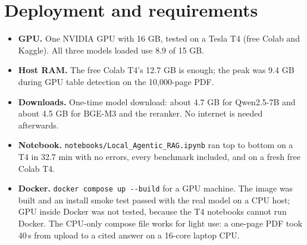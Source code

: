 \documentclass[10pt,a4paper]{article}
\begin{document}
\section{Deployment and requirements}
\begin{itemize}
  \item \textbf{GPU.} One NVIDIA GPU with 16 GB, tested on a Tesla T4 (free Colab and Kaggle). All three models loaded use 8.9 of 15 GB.
  \item \textbf{Host RAM.} The free Colab T4's 12.7 GB is enough; the peak was 9.4 GB during GPU table detection on the 10,000-page PDF.
  \item \textbf{Downloads.} One-time model download: about 4.7 GB for Qwen2.5-7B and about 4.5 GB for BGE-M3 and the reranker. No internet is needed afterwards.
  \item \textbf{Notebook.} \texttt{notebooks/Local\_Agentic\_RAG.ipynb} ran top to bottom on a T4 in 32.7 min with no errors, every benchmark included, and on a fresh free Colab T4.
  \item \textbf{Docker.} \texttt{docker compose up -{}-build} for a GPU machine. The image was built and an install smoke test passed with the real model on a CPU host;
        GPU inside Docker was not tested, because the T4 notebooks cannot run Docker. The CPU-only compose file works for light use: a one-page PDF took 40\,s from upload to a cited answer on a 16-core laptop CPU.
\end{itemize}

\end{document}
